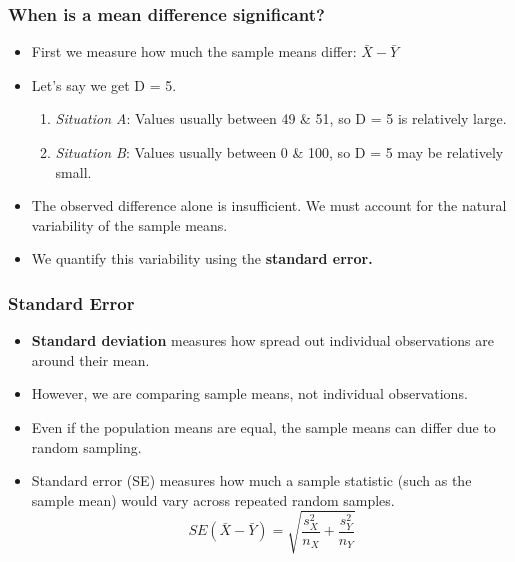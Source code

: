 \documentclass{beamer}
\begin{document}
\begin{frame}[t]
\frametitle{When is a mean difference significant?}
\begin{itemize}
    \item First we measure how much the sample means differ: $\bar{X}-\bar{Y}$
    \vspace{0.3em}
    \item Let's say we get D = 5. 
    \vspace{0.1em}
    \begin{enumerate}
        \item \textit{Situation A}: Values usually between 49 \& 51, so D = 5 is relatively large.
        \vspace{0.2em}
        \item \textit{Situation B}: Values usually between 0 \& 100, so D = 5 may be relatively small.
    \end{enumerate}
    \vspace{0.3em}
    \item The observed difference alone is insufficient. We must account for the natural variability of the sample means.
    \vspace{0.3em}
    \item We quantify this variability using the \textbf{standard error.}

\end{itemize}
    
\end{frame}

\begin{frame}[t]
\frametitle{Standard Error}
\begin{itemize}
    \item \textbf{Standard deviation} measures how spread out individual observations are around their mean.
    \item However, we are comparing sample means, not individual observations.
    \item Even if the population means are equal, the sample means can differ due to random sampling.
    \item Standard error (SE) measures how much a sample statistic (such as the sample mean) would vary across repeated random samples.
 \[
\boxed{
SE(\bar X-\bar Y)=
\sqrt{\frac{s_X^2}{n_X}+\frac{s_Y^2}{n_Y}}
}
\]
\end{itemize}
    
\end{frame}
\end{document}
